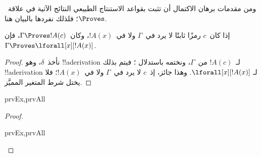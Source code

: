 \documentclass[../../../include/open-logic-section]{subfiles}
\begin{document}


\begin{explain}
  ومن مقدمات برهان الاكتمال أن تثبت بقواعد الاستنتاج الطبيعي
  النتائج الآتية في علاقة~$\Proves$؛ فلذلك نفردها بالبيان هنا.
\end{explain}

\begin{thm}
 إذا كان~$c$ رمزًا ثابتًا لا يرد
في~$\Gamma$ ولا في~$!A(x)$، وكان~$\Gamma \Proves !A(c)$، فإن
$\Gamma \Proves \lforall[x][!A(x)]$.
\end{thm}

\begin{proof}
نأخذ~$\delta$، وهو !!a{derivation} لـ~$!A(c)$ من~$\Gamma$، ونختمه
باستدلال \Intro{\lforall}؛ فيتم بذلك !!a{derivation} لـ
$\lforall[x][!A(x)]$. وهذا جائز، إذ~$c$ لا يرد في~$\Gamma$ ولا
في~$!A(x)$؛ فلا يختل شرط المتغير المميَّز.
\end{proof}

\begin{prop}
\begin{tagenumerate}{prvEx,prvAll}

\end{tagenumerate}
\end{prop}

\begin{proof}
\begin{tagenumerate}{prvEx,prvAll}

\end{tagenumerate}
\end{proof}
\end{document}
